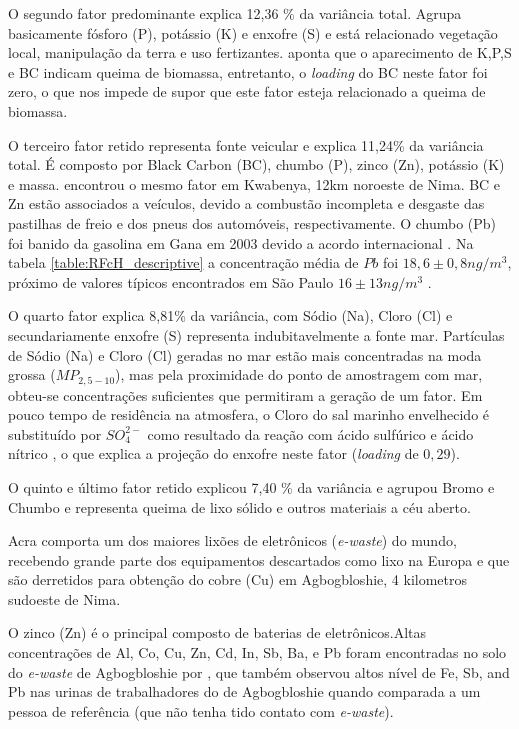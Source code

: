 O segundo fator predominante explica 12,36 \% da variância total. 
Agrupa basicamente fósforo (P), potássio (K) e enxofre (S) e está relacionado
vegetação local, manipulação da terra e uso fertizantes. 
\citet{reid2005} aponta que o aparecimento de K,P,S e BC indicam queima de
biomassa, entretanto, o \textit{loading} do BC neste fator foi zero, o que nos
impede de supor que este fator esteja relacionado a queima de biomassa. 

O terceiro fator retido representa fonte veicular e explica 11,24\% da variância
total. É composto por Black Carbon (BC), chumbo (P), zinco (Zn), potássio (K) e 
massa. \citet{aboh2009} encontrou o mesmo fator em Kwabenya, 12km noroeste de 
Nima. BC e Zn estão associados a veículos, devido a combustão 
incompleta e desgaste das pastilhas de freio e dos pneus dos automóveis, 
respectivamente. O chumbo (Pb) foi banido da gasolina em Gana em 2003 devido 
a acordo internacional \citep{epa2015}.  
Na tabela \ref{table:RFcH_descriptive} a concentração média de $Pb$ 
foi $18,6 \pm 0,8 n g /m^3$, próximo de valores típicos encontrados em São Paulo 
$16 \pm 13 n g /m^3$ \citep{andrade2012}.

O quarto fator explica 8,81\% da variância, com Sódio (Na), Cloro (Cl) e
secundariamente enxofre (S) representa indubitavelmente a fonte mar. 
Partículas de Sódio (Na) e Cloro (Cl) geradas no mar estão mais concentradas 
na moda grossa ($MP_{2,5-10}$), mas pela proximidade do ponto de amostragem 
com mar, obteu-se concentrações suficientes que permitiram a geração de um fator. 
Em pouco tempo de residência na atmosfera, o Cloro do sal marinho envelhecido 
é substituído por $SO_4^{2-}$ como resultado da reação com ácido sulfúrico e 
ácido nítrico \citep{mcinnes1994}, o que explica a projeção do enxofre neste
fator (\textit{loading} de $0,29$).

O quinto e último fator retido explicou 7,40 \% da variância e agrupou
Bromo e Chumbo e representa queima de lixo sólido e outros materiais a céu 
aberto. 

Acra comporta um dos maiores lixões de eletrônicos (\textit{e-waste}) 
do mundo, recebendo grande parte dos equipamentos descartados como lixo na 
Europa e que são derretidos para obtenção do cobre (Cu) em Agbogbloshie, 
4 kilometros sudoeste de Nima.  

O zinco (Zn) é o principal composto de baterias de eletrônicos.Altas 
concentrações de Al, Co, Cu, Zn, Cd, In, Sb, Ba, e Pb foram encontradas
no solo do \textit{e-waste} de Agbogbloshie por \citet{asante2012},
que também observou altos nível de Fe, Sb, and Pb nas urinas de trabalhadores 
do de Agbogbloshie quando comparada a um pessoa de referência
(que não tenha tido contato com \textit{e-waste}).

